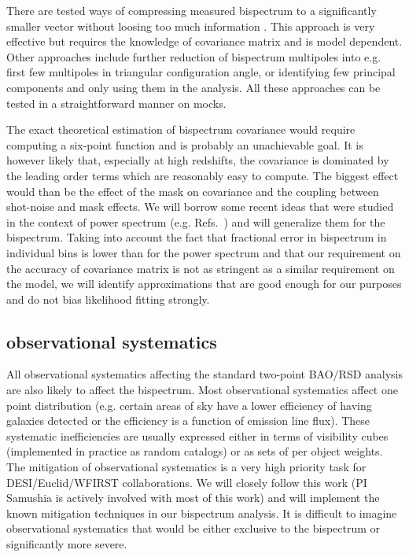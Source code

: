 There are tested ways of compressing measured bispectrum to a significantly
smaller vector without loosing too much information
\cite{2000MNRAS.317..965H,2016PhRvD..93h3525Z,2017MNRAS.471.1581B,2017MNRAS.472.4244H,2018MNRAS.476.4045G}.
This approach is very effective but requires the knowledge of covariance matrix
and is model dependent. Other approaches include further reduction of
bispectrum multipoles into e.g. first few multipoles in triangular
configuration angle, or identifying few principal components and only using
them in the analysis. All these approaches can be tested in a straightforward
manner on mocks.

The exact theoretical estimation of bispectrum covariance would require
computing a six-point function and is probably an unachievable goal. It is
however likely that, especially at high redshifts, the covariance is dominated
by the leading order terms which are reasonably easy to compute. The biggest
effect would than be the effect of the mask on covariance and the coupling
between shot-noise and mask effects. We will borrow some recent ideas that were
studied in the context of power spectrum (e.g. Refs.~\cite{2008MNRAS.389..766P,2015MNRAS.454.4326P,2016MNRAS.457..993P,2016MNRAS.460.1567P,2016MNRAS.462.2681O}) and will
generalize them for the bispectrum. Taking into account the fact that
fractional error in bispectrum in individual bins is lower than for the power
spectrum and that our requirement on the accuracy of covariance matrix is not
as stringent as a similar requirement on the model, we will identify
approximations that are good enough for our purposes and do not bias likelihood
fitting strongly. 

\subsection*{observational systematics}

All observational systematics affecting the standard two-point BAO/RSD analysis
are also likely to affect the bispectrum. Most observational systematics affect
one point distribution (e.g. certain areas of sky have a lower efficiency of
having galaxies detected or the efficiency is a function of emission line
flux). These systematic inefficiencies are usually expressed either in terms of
visibility cubes (implemented in practice as random catalogs) or as sets of
per object weights. The mitigation of observational systematics is a very high
priority task for DESI/Euclid/WFIRST collaborations. We will closely follow
this work (PI Samushia is actively involved with most of this work) and will
implement the known mitigation techniques in our bispectrum analysis. It is
difficult to imagine observational systematics that would be either exclusive
to the bispectrum or significantly more severe.

